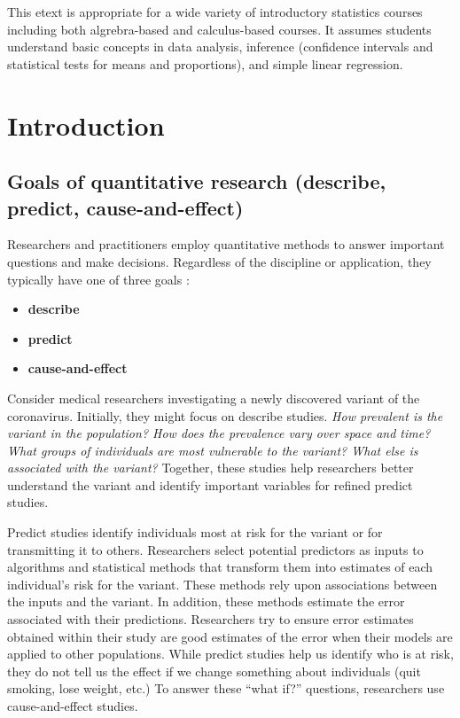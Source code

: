 \documentclass[
]{book}
\begin{document}
This etext is appropriate for a wide variety of introductory statistics courses including both algrebra-based and calculus-based courses. It assumes students understand basic concepts in data analysis, inference (confidence intervals and statistical tests for means and proportions), and simple linear regression.

\hypertarget{introduction}{%
\chapter{Introduction}\label{introduction}}

\hypertarget{goals-of-quantitative-research-describe-predict-cause-and-effect}{%
\section{Goals of quantitative research (describe, predict, cause-and-effect)}\label{goals-of-quantitative-research-describe-predict-cause-and-effect}}

Researchers and practitioners employ quantitative methods to answer important questions and make decisions. Regardless of the discipline or application, they typically have one of three goals \citep{cozby2020methods}:

\begin{itemize}
\item
  \textbf{describe}
\item
  \textbf{predict}
\item
  \textbf{cause-and-effect}
\end{itemize}

Consider medical researchers investigating a newly discovered variant of the coronavirus. Initially, they might focus on describe studies. \emph{How prevalent is the variant in the population? How does the prevalence vary over space and time? What groups of individuals are most vulnerable to the variant? What else is associated with the variant?} Together, these studies help researchers better understand the variant and identify important variables for refined predict studies.

Predict studies identify individuals most at risk for the variant or for transmitting it to others. Researchers select potential predictors as inputs to algorithms and statistical methods that transform them into estimates of each individual's risk for the variant. These methods rely upon associations between the inputs and the variant. In addition, these methods estimate the error associated with their predictions. Researchers try to ensure error estimates obtained within their study are good estimates of the error when their models are applied to other populations. While predict studies help us identify who is at risk, they do not tell us the effect if we change something about individuals (quit smoking, lose weight, etc.) To answer these ``what if?'' questions, researchers use cause-and-effect studies.
\end{document}
